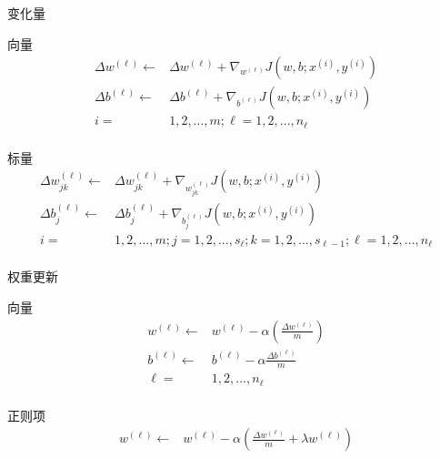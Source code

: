 \begin{frame}{变化量}

\begin{block}{向量}
\[\begin{aligned}
  \Delta {w^{(\ell )}} \leftarrow  & \Delta {w^{(\ell )}} + {\nabla _{{w^{(\ell )}}}}J(w,b;{x^{(i)}},{y^{(i)}}) \\ 
  \Delta {b^{(\ell )}} \leftarrow  & \Delta {b^{(\ell )}} + {\nabla _{{b^{(\ell )}}}}J(w,b;{x^{(i)}},{y^{(i)}}) \\ 
  i =  & 1,2,...,m; \ell  = 1,2,...,{n_\ell }  \\
\end{aligned} \]
\end{block}

\begin{block}{标量}
\[\begin{aligned}
  \Delta w_{jk}^{(\ell )} \leftarrow  & \Delta w_{jk}^{(\ell )} + {\nabla _{w_{jk}^{(\ell )}}}J(w,b;{x^{(i)}},{y^{(i)}}) \\ 
  \Delta b_j^{(\ell )} \leftarrow  & \Delta b_j^{(\ell )} + {\nabla _{b_j^{(\ell )}}}J(w,b;{x^{(i)}},{y^{(i)}}) \\ 
  i =  & 1,2,...,m; j = 1,2,...,{s_\ell }; k = 1,2,...,{s_{\ell  - 1}}; \ell = 1,2,...,{n_\ell } \\ 
\end{aligned} \]
\end{block}
\end{frame}

\begin{frame}{权重更新}

\begin{block}{向量}
\[\begin{aligned}
  {w^{(\ell )}} \leftarrow  & {w^{(\ell )}} - \alpha \left( {\frac{{\Delta {w^{(\ell )}}}}{m}} \right) \\ 
  {b^{(\ell )}} \leftarrow  & {b^{(\ell )}} - \alpha \frac{{\Delta {b^{(\ell )}}}}{m} \\ 
  \ell  = & 1,2,...,{n_\ell }  \\
\end{aligned} \]
\end{block}

\begin{block}{正则项}
\[\begin{aligned}
  {w^{(\ell )}} \leftarrow  & {w^{(\ell )}} - \alpha \left( {\frac{{\Delta {w^{(\ell )}}}}{m} + \lambda {w^{(\ell )}}} \right) \\ 
\end{aligned} \]
\end{block}
\end{frame}


